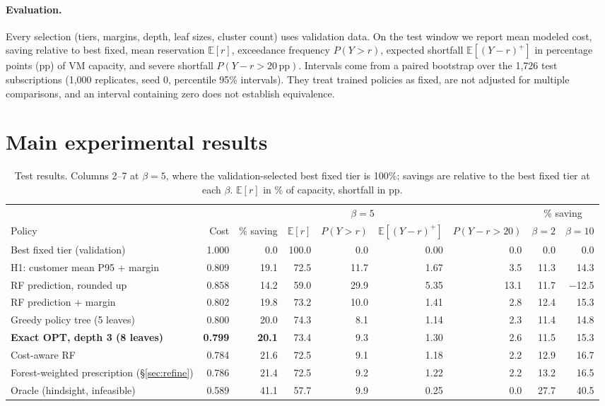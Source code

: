 \documentclass[10pt]{article}
\newcommand{\Ex}{\mathbb{E}}
\newcommand{\pp}{\,\text{pp}}
\begin{document}
\paragraph{Evaluation.} Every selection (tiers, margins, depth, leaf sizes, cluster count) uses validation data. On the test window we report mean modeled cost, saving relative to best fixed, mean reservation $\Ex[r]$, exceedance frequency $P(Y>r)$, expected shortfall $\Ex[(Y-r)^+]$ in percentage points (pp) of VM capacity, and severe shortfall $P(Y-r>20\pp)$. Intervals come from a paired bootstrap over the 1,726 test subscriptions (1,000 replicates, seed 0, percentile 95\% intervals). They treat trained policies as fixed, are not adjusted for multiple comparisons, and an interval containing zero does not establish equivalence.

\section{Main experimental results}
\label{sec:results}

\begin{table}[t]
\centering\small
\caption{Test results. Columns 2--7 at $\beta=5$, where the validation-selected best fixed tier is 100\%; savings are relative to the best fixed tier at each $\beta$. $\Ex[r]$ in \% of capacity, shortfall in pp.}
\label{tab:main}
\setlength{\tabcolsep}{4pt}
\begin{tabular}{lrrrrrr|rr}
\toprule
 & \multicolumn{6}{c|}{$\beta=5$} & \multicolumn{2}{c}{\% saving} \\
Policy & Cost & \% saving & $\Ex[r]$ & $P(Y{>}r)$ & $\Ex[(Y{-}r)^+]$ & $P(Y{-}r{>}20)$ & $\beta{=}2$ & $\beta{=}10$ \\
\midrule
Best fixed tier (validation) & 1.000 & 0.0 & 100.0 & 0.0 & 0.00 & 0.0 & 0.0 & 0.0 \\
H1: customer mean P95 + margin & 0.809 & 19.1 & 72.5 & 11.7 & 1.67 & 3.5 & 11.3 & 14.3 \\
RF prediction, rounded up & 0.858 & 14.2 & 59.0 & 29.9 & 5.35 & 13.1 & 11.7 & $-$12.5 \\
RF prediction + margin & 0.802 & 19.8 & 73.2 & 10.0 & 1.41 & 2.8 & 12.4 & 15.3 \\
Greedy policy tree (5 leaves) & 0.800 & 20.0 & 74.3 & 8.1 & 1.14 & 2.3 & 11.4 & 14.8 \\
\textbf{Exact OPT, depth 3 (8 leaves)} & \textbf{0.799} & \textbf{20.1} & 73.4 & 9.3 & 1.30 & 2.6 & 11.5 & 15.3 \\
Cost-aware RF & 0.784 & 21.6 & 72.5 & 9.1 & 1.18 & 2.2 & 12.9 & 16.7 \\
Forest-weighted prescription (\S\ref{sec:refine}) & 0.786 & 21.4 & 72.5 & 9.2 & 1.22 & 2.2 & 13.2 & 16.5 \\
\midrule
Oracle (hindsight, infeasible) & 0.589 & 41.1 & 57.7 & 9.9 & 0.25 & 0.0 & 27.7 & 40.5 \\
\bottomrule
\end{tabular}
\vspace{-0.5em}
\end{table}
\end{document}
